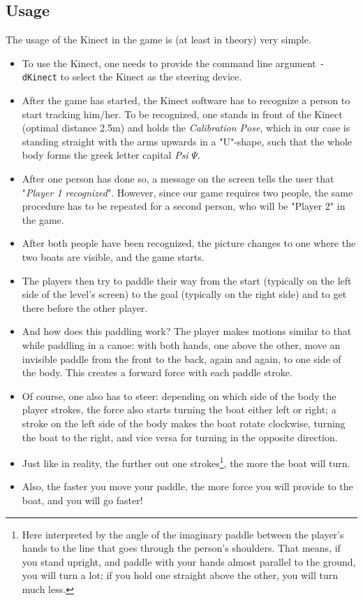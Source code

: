 \subsection{Usage}
The usage of the Kinect in the game is (at least in theory) very simple.
\begin{itemize}
\item To use the Kinect, one needs to provide the command line argument \texttt{-dKinect} to select the Kinect as the steering device.
\item After the game has started, the Kinect software has to recognize a person to start tracking him/her. To be recognized, one stands in front of the Kinect (optimal distance 2.5m) and holds the \emph{Calibration Pose}, which in our case is standing straight with the arms upwards in a "U"-shape, such that the whole body forms the greek letter capital \emph{Psi} $\Psi$.
\item After one person has done so, a message on the screen tells the user that "\emph{Player 1 recognized}". However, since our game requires two people, the same procedure has to be repeated for a second person, who will be "Player 2" in the game.
\item After both people have been recognized, the picture changes to one where the two boats are visible, and the game starts.
\item The players then try to paddle their way from the start (typically on the left side of the level's screen) to the goal (typically on the right side) and to get there before the other player.
\item And how does this paddling work? The player makes motions similar to that while paddling in a canoe: with both hands, one above the other, move an invisible paddle from the front to the back, again and again, to one side of the body. This creates a forward force with each paddle stroke. 
\item Of course, one also has to steer: depending on which side of the body the player strokes, the force also starts turning the boat either left or right; a stroke on the left side of the body makes the boat rotate clockwise, turning the boat to the right, and vice versa for turning in the opposite direction.
\item Just like in reality, the further out one strokes\footnote{Here interpreted by the angle of the imaginary paddle between the player's hands to the line that goes through the person's shoulders. That means, if you stand upright, and paddle with your hands almost parallel to the ground, you will turn a lot; if you hold one straight above the other, you will turn much less.}, the more the boat will turn.
\item Also, the faster you move your paddle, the more force you will provide to the boat, and you will go faster!
\end{itemize}

